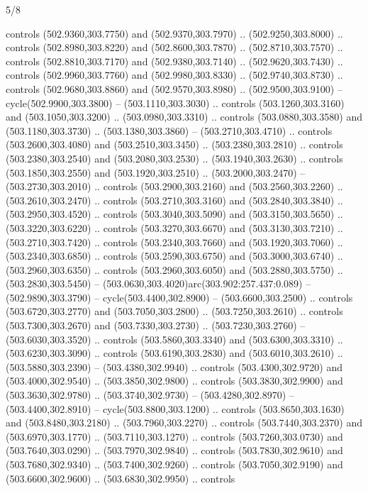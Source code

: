 \begin{flagdescription}{5/8}
\begin{scope}[xshift=0.5\flaglength,yshift=0.5\flagwidth,scale=\flagwidth/475.63]
\begin{scope}[y=0.8pt, x=0.8pt, yscale=-1, xscale=1,shift={(-450,-300)}]
\begin{scope}[cm={{1.0,0.0,0.0,1.0,(-0.0002,0.12556)}},cm={{1.0,0.0,0.0,1.0,(0.00179,0.0)}}]
\begin{scope}[cm={{1.11592,0.0,0.0,1.11592,(-106.89933,-41.77764)}}]
\begin{scope}[draw=black,fill=cfff]
\begin{scope}[fill=black]
  controls (502.9360,303.7750) and (502.9370,303.7970) .. (502.9250,303.8000) ..
  controls (502.8980,303.8220) and (502.8600,303.7870) .. (502.8710,303.7570) ..
  controls (502.8810,303.7170) and (502.9380,303.7140) .. (502.9620,303.7430) ..
  controls (502.9960,303.7760) and (502.9980,303.8330) .. (502.9740,303.8730) ..
  controls (502.9680,303.8860) and (502.9570,303.8980) .. (502.9500,303.9100) --
  cycle(502.9900,303.3800) -- (503.1110,303.3030) .. controls
  (503.1260,303.3160) and (503.1050,303.3200) .. (503.0980,303.3310) .. controls
  (503.0880,303.3580) and (503.1180,303.3730) .. (503.1380,303.3860) --
  (503.2710,303.4710) .. controls (503.2600,303.4080) and (503.2510,303.3450) ..
  (503.2380,303.2810) .. controls (503.2380,303.2540) and (503.2080,303.2530) ..
  (503.1940,303.2630) .. controls (503.1850,303.2550) and (503.1920,303.2510) ..
  (503.2000,303.2470) -- (503.2730,303.2010) .. controls (503.2900,303.2160) and
  (503.2560,303.2260) .. (503.2610,303.2470) .. controls (503.2710,303.3160) and
  (503.2840,303.3840) .. (503.2950,303.4520) .. controls (503.3040,303.5090) and
  (503.3150,303.5650) .. (503.3220,303.6220) .. controls (503.3270,303.6670) and
  (503.3130,303.7210) .. (503.2710,303.7420) .. controls (503.2340,303.7660) and
  (503.1920,303.7060) .. (503.2340,303.6850) .. controls (503.2590,303.6750) and
  (503.3000,303.6740) .. (503.2960,303.6350) .. controls (503.2960,303.6050) and
  (503.2880,303.5750) .. (503.2830,303.5450) --
  (503.0630,303.4020)arc(303.902:257.437:0.089) -- (502.9890,303.3790) --
  cycle(503.4400,302.8900) -- (503.6600,303.2500) .. controls
  (503.6720,303.2770) and (503.7050,303.2800) .. (503.7250,303.2610) .. controls
  (503.7300,303.2670) and (503.7330,303.2730) .. (503.7230,303.2760) --
  (503.6030,303.3520) .. controls (503.5860,303.3340) and (503.6300,303.3310) ..
  (503.6230,303.3090) .. controls (503.6190,303.2830) and (503.6010,303.2610) ..
  (503.5880,303.2390) -- (503.4380,302.9940) .. controls (503.4300,302.9720) and
  (503.4000,302.9540) .. (503.3850,302.9800) .. controls (503.3830,302.9900) and
  (503.3630,302.9780) .. (503.3740,302.9730) -- (503.4280,302.8970) --
  (503.4400,302.8910) -- cycle(503.8800,303.1200) .. controls
  (503.8650,303.1630) and (503.8480,303.2180) .. (503.7960,303.2270) .. controls
  (503.7440,303.2370) and (503.6970,303.1770) .. (503.7110,303.1270) .. controls
  (503.7260,303.0730) and (503.7640,303.0290) .. (503.7970,302.9840) .. controls
  (503.7830,302.9610) and (503.7680,302.9340) .. (503.7400,302.9260) .. controls
  (503.7050,302.9190) and (503.6600,302.9600) .. (503.6830,302.9950) .. controls

\end{scope}
\end{scope}
\end{scope}
\end{scope}
\end{scope}
\end{scope}
\end{flagdescription}
